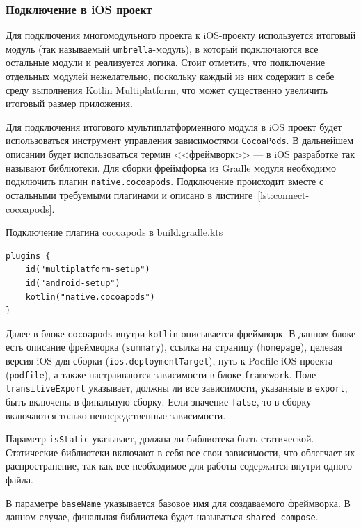 \documentclass[14pt, russian]{scrartcl}
\begin{document}
\subsubsection{Подключение в iOS проект}\label{sect:setup-ios}

Для подключения многомодульного проекта к iOS-проекту используется итоговый модуль (так называемый \texttt{umbrella}-модуль), в который подключаются все остальные модули и реализуется логика. Стоит отметить, что подключение отдельных модулей нежелательно, поскольку каждый из них содержит в себе среду выполнения Kotlin Multiplatform, что может существенно увеличить итоговый размер приложения.

Для подключения итогового мультиплатформенного модуля в iOS проект будет использоваться инструмент управления зависимостями \texttt{CocoaPods}. В дальнейшем описании будет использоваться термин <<фреймворк>> --- в iOS разработке так называют библиотеки. Для сборки фреймфорка из Gradle модуля необходимо подключить плагин \texttt{native.cocoapods}. Подключение происходит вместе с остальными требуемыми плагинами и описано в листинге~\ref{lst:connect-cocoapods}.
\begin{listing}[!htb]
\caption{Подключение плагина cocoapods в build.gradle.kts}
\label{lst:connect-cocoapods}
\begin{verbatim}
plugins {
    id("multiplatform-setup")
    id("android-setup")
    kotlin("native.cocoapods")
}
\end{verbatim}
\end{listing}

Далее в блоке \texttt{cocoapods} внутри \texttt{kotlin} описывается фреймворк. В данном блоке есть описание фреймворка (\texttt{summary}), ссылка на страницу (\texttt{homepage}), целевая версия iOS для сборки (\texttt{ios.deploymentTarget}), путь к Podfile iOS проекта (\texttt{podfile}), а также настраиваются зависимости в блоке \texttt{framework}. Поле \texttt{transitiveExport} указывает, должны ли все зависимости, указанные в \texttt{export}, быть включены в финальную сборку. Если значение \texttt{false}, то в сборку включаются только непосредственные зависимости.

Параметр \texttt{isStatic} указывает, должна ли библиотека быть статической. Статические библиотеки включают в себя все свои зависимости, что облегчает их распространение, так как все необходимое для работы содержится внутри одного файла.

В параметре \texttt{baseName} указывается базовое имя для создаваемого фреймворка. В данном случае, финальная библиотека будет называться \texttt{shared\_compose}.
\end{document}
